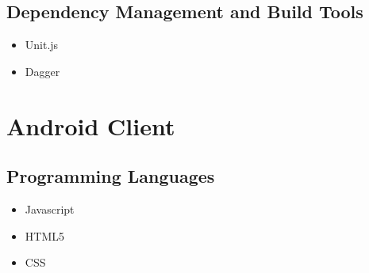 \documentclass[11pt,fleqn]{book} %
\begin{document}
	\subsection{Dependency Management and Build Tools}
	\begin{itemize}
		\item Unit.js
		\item Dagger
	\end{itemize}
	\section{Android Client}
	\subsection{Programming Languages}
	\begin{itemize}
		\item Javascript
		\item HTML5
		\item CSS
	\end{itemize}
\end{document}
